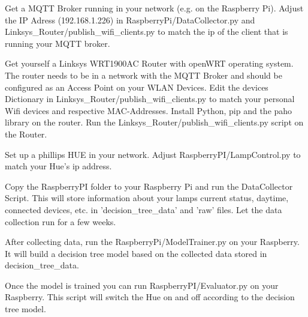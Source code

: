 
Get a MQTT Broker running in your network (e.g. on the Raspberry Pi). Adjust the IP Adress (192.168.1.226) in RaspberryPi/DataCollector.py and Linksys\_Router/publish\_wifi\_clients.py to match the ip of the client that is running your MQTT broker.

Get yourself a Linksys WRT1900AC Router with openWRT operating system. The router needs to be in a network with the MQTT Broker and should be configured as an Access Point on your WLAN Devices. Edit the devices Dictionary in Linksys\_Router/publish\_wifi\_clients.py to match your personal Wifi devices and respective MAC-Addresses. Install Python, pip and the paho library on the router. Run the Linksys\_Router/publish\_wifi\_clients.py script on the Router.

Set up a phillips HUE in your network. Adjust RaspberryPI/LampControl.py to match your Hue's ip address.

Copy the RaspberryPI folder to your Raspberry Pi and run the DataCollector Script. This will store information about your lamps current status, daytime, connected devices, etc. in 'decision\_tree\_data' and 'raw' files. Let the data collection run for a few weeks.

After collecting data, run the RaspberryPi/ModelTrainer.py on your Raspberry. It will build a decision tree model based on the collected data stored in decision\_tree\_data.

Once the model is trained you can run RaspberryPI/Evaluator.py on your Raspberry. This script will switch the Hue on and off according to the decision tree model.
